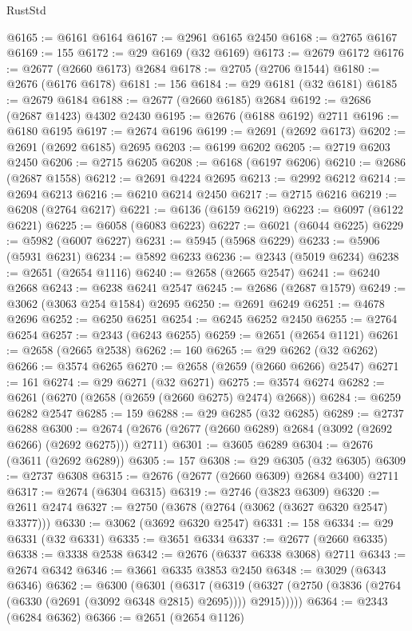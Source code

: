 \begin{lexlean}{RustStd}
\begin{coremodule}
@6165 := @6161 @6164
@6167 := @2961 @6165 @2450
@6168 := @2765 @6167
@6169 := 155
@6172 := @29 @6169 (@32 @6169)
@6173 := @2679 @6172
@6176 := @2677 (@2660 @6173) @2684
@6178 := @2705 (@2706 @1544)
@6180 := @2676 (@6176 @6178)
@6181 := 156
@6184 := @29 @6181 (@32 @6181)
@6185 := @2679 @6184
@6188 := @2677 (@2660 @6185) @2684
@6192 := @2686 (@2687 @1423) @4302 @2430
@6195 := @2676 (@6188 @6192) @2711
@6196 := @6180 @6195
@6197 := @2674 @6196
@6199 := @2691 (@2692 @6173)
@6202 := @2691 (@2692 @6185) @2695
@6203 := @6199 @6202
@6205 := @2719 @6203 @2450
@6206 := @2715 @6205
@6208 := @6168 (@6197 @6206)
@6210 := @2686 (@2687 @1558)
@6212 := @2691 @4224 @2695
@6213 := @2992 @6212
@6214 := @2694 @6213
@6216 := @6210 @6214 @2450
@6217 := @2715 @6216
@6219 := @6208 (@2764 @6217)
@6221 := @6136 (@6159 @6219)
@6223 := @6097 (@6122 @6221)
@6225 := @6058 (@6083 @6223)
@6227 := @6021 (@6044 @6225)
@6229 := @5982 (@6007 @6227)
@6231 := @5945 (@5968 @6229)
@6233 := @5906 (@5931 @6231)
@6234 := @5892 @6233
@6236 := @2343 (@5019 @6234)
@6238 := @2651 (@2654 @1116)
@6240 := @2658 (@2665 @2547)
@6241 := @6240 @2668
@6243 := @6238 @6241 @2547
@6245 := @2686 (@2687 @1579)
@6249 := @3062 (@3063 @254 @1584) @2695
@6250 := @2691 @6249
@6251 := @4678 @2696
@6252 := @6250 @6251
@6254 := @6245 @6252 @2450
@6255 := @2764 @6254
@6257 := @2343 (@6243 @6255)
@6259 := @2651 (@2654 @1121)
@6261 := @2658 (@2665 @2538)
@6262 := 160
@6265 := @29 @6262 (@32 @6262)
@6266 := @3574 @6265
@6270 := @2658 (@2659 (@2660 @6266) @2547)
@6271 := 161
@6274 := @29 @6271 (@32 @6271)
@6275 := @3574 @6274
@6282 := @6261 (@6270 (@2658 (@2659 (@2660 @6275) @2474) @2668))
@6284 := @6259 @6282 @2547
@6285 := 159
@6288 := @29 @6285 (@32 @6285)
@6289 := @2737 @6288
@6300 := @2674 (@2676 (@2677 (@2660 @6289) @2684 (@3092 (@2692 @6266) (@2692 @6275))) @2711)
@6301 := @3605 @6289
@6304 := @2676 (@3611 (@2692 @6289))
@6305 := 157
@6308 := @29 @6305 (@32 @6305)
@6309 := @2737 @6308
@6315 := @2676 (@2677 (@2660 @6309) @2684 @3400) @2711
@6317 := @2674 (@6304 @6315)
@6319 := @2746 (@3823 @6309)
@6320 := @2611 @2474
@6327 := @2750 (@3678 (@2764 (@3062 (@3627 @6320 @2547) @3377)))
@6330 := @3062 (@3692 @6320 @2547)
@6331 := 158
@6334 := @29 @6331 (@32 @6331)
@6335 := @3651 @6334
@6337 := @2677 (@2660 @6335)
@6338 := @3338 @2538
@6342 := @2676 (@6337 @6338 @3068) @2711
@6343 := @2674 @6342
@6346 := @3661 @6335 @3853 @2450
@6348 := @3029 (@6343 @6346)
@6362 := @6300
    (@6301
      (@6317
        (@6319 (@6327 (@2750 (@3836 (@2764 (@6330 (@2691 (@3092 @6348 @2815) @2695)))) @2915)))))
@6364 := @2343 (@6284 @6362)
@6366 := @2651 (@2654 @1126)

\end{coremodule}
\end{lexlean}
